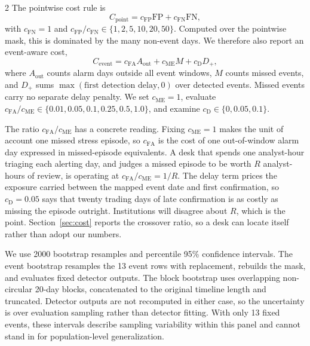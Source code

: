 \documentclass{book}
\begin{document}
\begin{multicols}{2}
The pointwise cost rule is
\begin{equation}
C_{\mathrm{point}}=c_{\mathrm{FP}}\mathrm{FP}+c_{\mathrm{FN}}\mathrm{FN},
\end{equation}
with $c_{\mathrm{FN}}=1$ and $c_{\mathrm{FP}}/c_{\mathrm{FN}}\in\{1,2,5,10,20,50\}$. Computed over the pointwise mask, this is dominated by the many non-event days. We therefore also report an event-aware cost,
\begin{equation}
\label{eq:eventcost}
C_{\mathrm{event}}=c_{\mathrm{FA}}A_{\mathrm{out}}+c_{\mathrm{ME}}M+c_{\mathrm{D}}D_+,
\end{equation}
where $A_{\mathrm{out}}$ counts alarm days outside all event windows, $M$ counts missed events, and $D_+$ sums $\max(\text{first detection delay},0)$ over detected events. Missed events carry no separate delay penalty. We set $c_{\mathrm{ME}}=1$, evaluate $c_{\mathrm{FA}}/c_{\mathrm{ME}}\in\{0.01,0.05,0.1,0.25,0.5,1.0\}$, and examine $c_{\mathrm{D}}\in\{0,0.05,0.1\}$.

The ratio $c_{\mathrm{FA}}/c_{\mathrm{ME}}$ has a concrete reading. Fixing $c_{\mathrm{ME}}=1$ makes the unit of account one missed stress episode, so $c_{\mathrm{FA}}$ is the cost of one out-of-window alarm day expressed in missed-episode equivalents. A desk that spends one analyst-hour triaging each alerting day, and judges a missed episode to be worth $R$ analyst-hours of review, is operating at $c_{\mathrm{FA}}/c_{\mathrm{ME}}=1/R$. The delay term prices the exposure carried between the mapped event date and first confirmation, so $c_{\mathrm{D}}=0.05$ says that twenty trading days of late confirmation is as costly as missing the episode outright. Institutions will disagree about $R$, which is the point. Section~\ref{sec:cost} reports the crossover ratio, so a desk can locate itself rather than adopt our numbers.

We use 2000 bootstrap resamples and percentile 95\% confidence intervals. The event bootstrap resamples the 13 event rows with replacement, rebuilds the mask, and evaluates fixed detector outputs. The block bootstrap uses overlapping non-circular 20-day blocks, concatenated to the original timeline length and truncated. Detector outputs are not recomputed in either case, so the uncertainty is over evaluation sampling rather than detector fitting. With only 13 fixed events, these intervals describe sampling variability within this panel and cannot stand in for population-level generalization.


\end{multicols}
\end{document}
